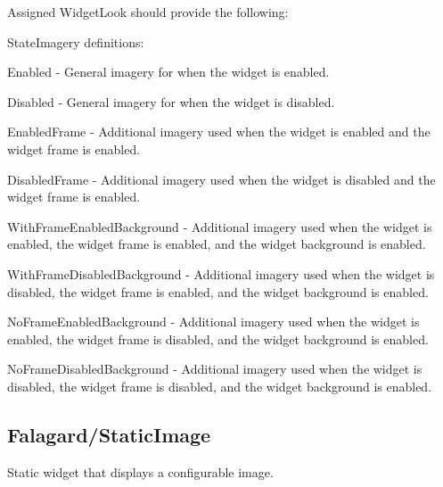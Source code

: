 Assigned Widget\+Look should provide the following\+: 
\begin{DoxyItemize}
\item State\+Imagery definitions\+: 
\begin{DoxyItemize}
\item Enabled -\/ General imagery for when the widget is enabled. 
\item Disabled -\/ General imagery for when the widget is disabled. 
\item Enabled\+Frame -\/ Additional imagery used when the widget is enabled and the widget frame is enabled. 
\item Disabled\+Frame -\/ Additional imagery used when the widget is disabled and the widget frame is enabled. 
\item With\+Frame\+Enabled\+Background -\/ Additional imagery used when the widget is enabled, the widget frame is enabled, and the widget background is enabled. 
\item With\+Frame\+Disabled\+Background -\/ Additional imagery used when the widget is disabled, the widget frame is enabled, and the widget background is enabled. 
\item No\+Frame\+Enabled\+Background -\/ Additional imagery used when the widget is enabled, the widget frame is disabled, and the widget background is enabled. 
\item No\+Frame\+Disabled\+Background -\/ Additional imagery used when the widget is disabled, the widget frame is disabled, and the widget background is enabled. 
\end{DoxyItemize}
\end{DoxyItemize}\hypertarget{fal_wr_ref_fal_wr_ref_sec_21}{}\subsection{Falagard/\+Static\+Image}\label{fal_wr_ref_fal_wr_ref_sec_21}
Static widget that displays a configurable image.

